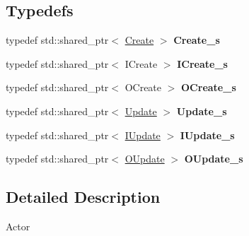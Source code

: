 \subsection*{\-Typedefs}
\begin{DoxyCompactItemize}
\item 
\hypertarget{namespaceNeb_1_1Message_1_1Actor_a9340ec2df7ed5e95cfb92322d1ce9be9}{typedef std\-::shared\-\_\-ptr$<$ \hyperlink{structNeb_1_1Message_1_1Actor_1_1Create}{\-Create} $>$ {\bfseries \-Create\-\_\-s}}\label{namespaceNeb_1_1Message_1_1Actor_a9340ec2df7ed5e95cfb92322d1ce9be9}

\item 
\hypertarget{namespaceNeb_1_1Message_1_1Actor_a3a55f7316d4619fea96c5112d1b1133c}{typedef std\-::shared\-\_\-ptr$<$ \-I\-Create $>$ {\bfseries \-I\-Create\-\_\-s}}\label{namespaceNeb_1_1Message_1_1Actor_a3a55f7316d4619fea96c5112d1b1133c}

\item 
\hypertarget{namespaceNeb_1_1Message_1_1Actor_ad320b8bb8d54c7d89fd20bbb4f0744f6}{typedef std\-::shared\-\_\-ptr$<$ \-O\-Create $>$ {\bfseries \-O\-Create\-\_\-s}}\label{namespaceNeb_1_1Message_1_1Actor_ad320b8bb8d54c7d89fd20bbb4f0744f6}

\item 
\hypertarget{namespaceNeb_1_1Message_1_1Actor_af91ec1ccf0cff311e28a9d01590b3ff8}{typedef std\-::shared\-\_\-ptr$<$ \hyperlink{structNeb_1_1Message_1_1Actor_1_1Update}{\-Update} $>$ {\bfseries \-Update\-\_\-s}}\label{namespaceNeb_1_1Message_1_1Actor_af91ec1ccf0cff311e28a9d01590b3ff8}

\item 
\hypertarget{namespaceNeb_1_1Message_1_1Actor_a7848cc05abd607867b14bb52b9472a97}{typedef std\-::shared\-\_\-ptr$<$ \hyperlink{structNeb_1_1Message_1_1Actor_1_1IUpdate}{\-I\-Update} $>$ {\bfseries \-I\-Update\-\_\-s}}\label{namespaceNeb_1_1Message_1_1Actor_a7848cc05abd607867b14bb52b9472a97}

\item 
\hypertarget{namespaceNeb_1_1Message_1_1Actor_a5ca2a5c6e54ddba99757cffc2f0f0395}{typedef std\-::shared\-\_\-ptr$<$ \hyperlink{structNeb_1_1Message_1_1Actor_1_1OUpdate}{\-O\-Update} $>$ {\bfseries \-O\-Update\-\_\-s}}\label{namespaceNeb_1_1Message_1_1Actor_a5ca2a5c6e54ddba99757cffc2f0f0395}

\end{DoxyCompactItemize}


\subsection{\-Detailed \-Description}
\-Actor 